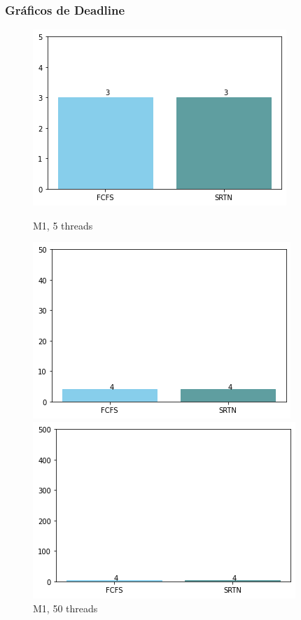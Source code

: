 \documentclass{beamer}
\begin{document}
\begin{frame}
\frametitle{Gráficos de Deadline}


\begin{figure}[!htb]
  \includegraphics[width=\linewidth]{imgs/deadline5-1}
  \caption{M1, 5 threads}\label{fig:awesome_image1}
\endminipage\hfill
{}
  \includegraphics[width=\linewidth]{imgs/deadline50-1}
  \caption{M1, 50 threads}\label{fig:awesome_image2}
\endminipage\hfill
{}%
  \includegraphics[width=\linewidth]{imgs/deadline500-1}

\end{figure}
\end{frame}
\end{document}
